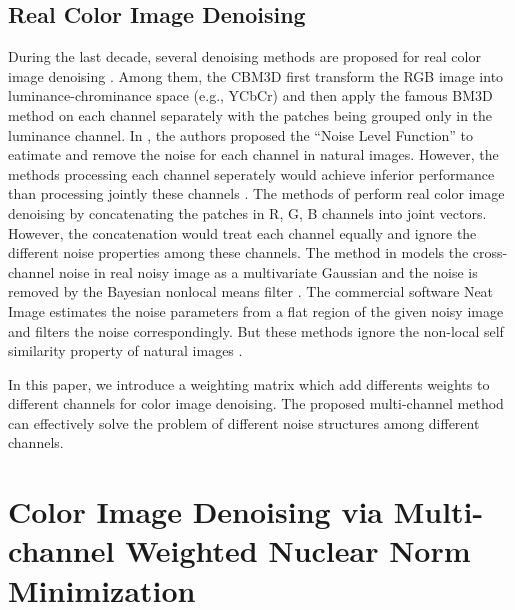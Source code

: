 \documentclass[10pt,twocolumn,letterpaper,sort&compress]{article}
\begin{document}
\subsection{Real Color Image Denoising}
During the last decade, several denoising methods are proposed for real color image denoising \cite{cbm3d,Liu2008,Zhu_2016_CVPR,noiseclinic}. Among them, the CBM3D \cite{cbm3d} first transform the RGB image into luminance-chrominance space (e.g., YCbCr) and then apply the famous BM3D method \cite{bm3d} on each channel separately with the patches being grouped only in the luminance channel. In \cite{Liu2008}, the authors proposed the ``Noise Level Function'' to eatimate and remove the noise for each channel in natural images. However, the methods processing each channel seperately would achieve inferior performance than processing jointly these channels \cite{mairal2008sparse}. The methods of \cite{noiseclinic,ncwebsite,Zhu_2016_CVPR} perform real color image denoising by concatenating the patches in R, G, B channels into joint vectors. However, the concatenation would treat each channel equally and ignore the different noise properties among these channels. The method in \cite{crosschannel2016} models the cross-channel noise in real noisy image as a multivariate Gaussian and the noise is removed by the Bayesian nonlocal means filter \cite{kervrann2007bayesian}. The commercial software Neat Image \cite{neatimage} estimates the noise parameters from a flat region of the given noisy image and filters the noise correspondingly. But these methods \cite{crosschannel2016,neatimage} ignore the non-local self similarity property of natural images \cite{bm3d,wnnm}. 

In this paper, we introduce a weighting matrix which add differents weights to different channels for color image denoising. The proposed multi-channel method can effectively solve the problem of different noise structures among different channels.

\section{Color Image Denoising via Multi-channel Weighted Nuclear Norm Minimization}
\end{document}
